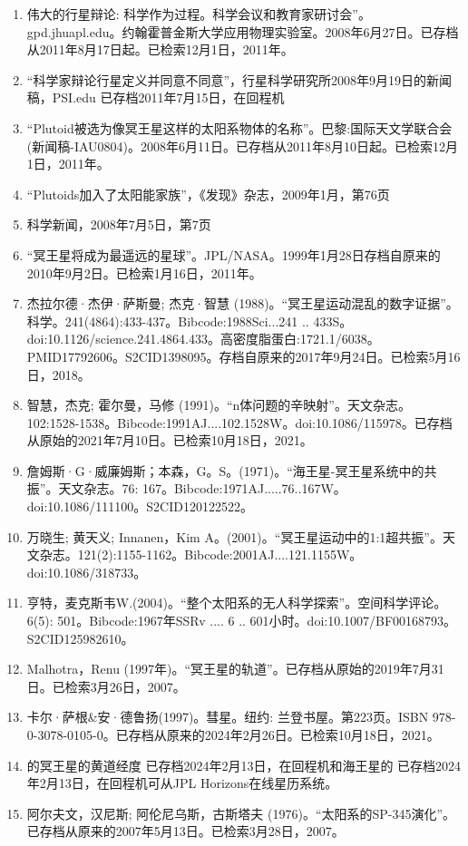 \begin{enumerate}
\item 伟大的行星辩论: 科学作为过程。科学会议和教育家研讨会”。gpd.jhuapl.edu。约翰霍普金斯大学应用物理实验室。2008年6月27日。已存档从2011年8月17日起。已检索12月1日，2011年。
\item “科学家辩论行星定义并同意不同意”，行星科学研究所2008年9月19日的新闻稿，PSI.edu 已存档2011年7月15日，在回程机
\item “Plutoid被选为像冥王星这样的太阳系物体的名称”。巴黎:国际天文学联合会(新闻稿-IAU0804)。2008年6月11日。已存档从2011年8月10日起。已检索12月1日，2011年。
\item “Plutoids加入了太阳能家族”，《发现》杂志，2009年1月，第76页
\item 科学新闻，2008年7月5日，第7页
\item “冥王星将成为最遥远的星球”。JPL/NASA。1999年1月28日存档自原来的2010年9月2日。已检索1月16日，2011年。
\item 杰拉尔德·杰伊·萨斯曼; 杰克·智慧 (1988)。“冥王星运动混乱的数字证据”。科学。241(4864):433-437。Bibcode:1988Sci...241 .. 433S。doi:10.1126/science.241.4864.433。高密度脂蛋白:1721.1/6038。PMID17792606。S2CID1398095。存档自原来的2017年9月24日。已检索5月16日，2018。  
\item 智慧，杰克; 霍尔曼，马修 (1991)。“n体问题的辛映射”。天文杂志。102:1528-1538。Bibcode:1991AJ....102.1528W。doi:10.1086/115978。已存档从原始的2021年7月10日。已检索10月18日，2021。
\item 詹姆斯·G·威廉姆斯；本森，G。S。(1971)。“海王星-冥王星系统中的共振”。天文杂志。76: 167。Bibcode:1971AJ.....76..167W。doi:10.1086/111100。S2CID120122522。 
\item 万晓生; 黄天义; Innanen，Kim A。(2001)。“冥王星运动中的1:1超共振”。天文杂志。121(2):1155-1162。Bibcode:2001AJ....121.1155W。doi:10.1086/318733。
\item 亨特，麦克斯韦W.(2004)。“整个太阳系的无人科学探索”。空间科学评论。6(5): 501。Bibcode:1967年SSRv .... 6 .. 601小时。doi:10.1007/BF00168793。S2CID125982610。 
\item Malhotra，Renu (1997年)。“冥王星的轨道”。已存档从原始的2019年7月31日。已检索3月26日，2007。
\item 卡尔·萨根&安·德鲁扬(1997)。彗星。纽约: 兰登书屋。第223页。ISBN 978-0-3078-0105-0。已存档从原来的2024年2月26日。已检索10月18日，2021。
\item 的冥王星的黄道经度 已存档2024年2月13日，在回程机和海王星的 已存档2024年2月13日，在回程机可从JPL Horizons在线星历系统。
\item 阿尔夫文，汉尼斯; 阿伦尼乌斯，古斯塔夫 (1976)。“太阳系的SP-345演化”。已存档从原来的2007年5月13日。已检索3月28日，2007。

\end{enumerate}
